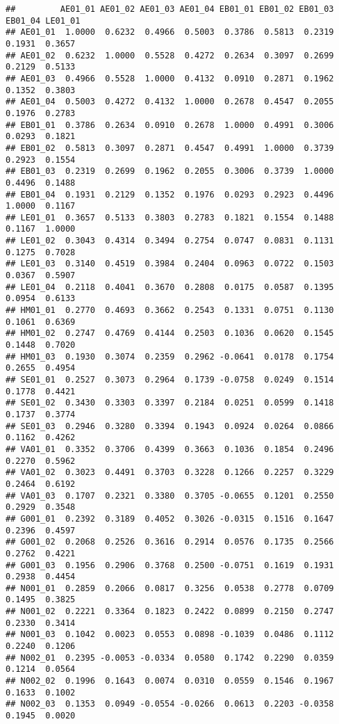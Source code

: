 \documentclass[
]{article}
\begin{document}
\begin{verbatim}
##         AE01_01 AE01_02 AE01_03 AE01_04 EB01_01 EB01_02 EB01_03 EB01_04 LE01_01
## AE01_01  1.0000  0.6232  0.4966  0.5003  0.3786  0.5813  0.2319  0.1931  0.3657
## AE01_02  0.6232  1.0000  0.5528  0.4272  0.2634  0.3097  0.2699  0.2129  0.5133
## AE01_03  0.4966  0.5528  1.0000  0.4132  0.0910  0.2871  0.1962  0.1352  0.3803
## AE01_04  0.5003  0.4272  0.4132  1.0000  0.2678  0.4547  0.2055  0.1976  0.2783
## EB01_01  0.3786  0.2634  0.0910  0.2678  1.0000  0.4991  0.3006  0.0293  0.1821
## EB01_02  0.5813  0.3097  0.2871  0.4547  0.4991  1.0000  0.3739  0.2923  0.1554
## EB01_03  0.2319  0.2699  0.1962  0.2055  0.3006  0.3739  1.0000  0.4496  0.1488
## EB01_04  0.1931  0.2129  0.1352  0.1976  0.0293  0.2923  0.4496  1.0000  0.1167
## LE01_01  0.3657  0.5133  0.3803  0.2783  0.1821  0.1554  0.1488  0.1167  1.0000
## LE01_02  0.3043  0.4314  0.3494  0.2754  0.0747  0.0831  0.1131  0.1275  0.7028
## LE01_03  0.3140  0.4519  0.3984  0.2404  0.0963  0.0722  0.1503  0.0367  0.5907
## LE01_04  0.2118  0.4041  0.3670  0.2808  0.0175  0.0587  0.1395  0.0954  0.6133
## HM01_01  0.2770  0.4693  0.3662  0.2543  0.1331  0.0751  0.1130  0.1061  0.6369
## HM01_02  0.2747  0.4769  0.4144  0.2503  0.1036  0.0620  0.1545  0.1448  0.7020
## HM01_03  0.1930  0.3074  0.2359  0.2962 -0.0641  0.0178  0.1754  0.2655  0.4954
## SE01_01  0.2527  0.3073  0.2964  0.1739 -0.0758  0.0249  0.1514  0.1778  0.4421
## SE01_02  0.3430  0.3303  0.3397  0.2184  0.0251  0.0599  0.1418  0.1737  0.3774
## SE01_03  0.2946  0.3280  0.3394  0.1943  0.0924  0.0264  0.0866  0.1162  0.4262
## VA01_01  0.3352  0.3706  0.4399  0.3663  0.1036  0.1854  0.2496  0.2270  0.5962
## VA01_02  0.3023  0.4491  0.3703  0.3228  0.1266  0.2257  0.3229  0.2464  0.6192
## VA01_03  0.1707  0.2321  0.3380  0.3705 -0.0655  0.1201  0.2550  0.2929  0.3548
## G001_01  0.2392  0.3189  0.4052  0.3026 -0.0315  0.1516  0.1647  0.2396  0.4597
## G001_02  0.2068  0.2526  0.3616  0.2914  0.0576  0.1735  0.2566  0.2762  0.4221
## G001_03  0.1956  0.2906  0.3768  0.2500 -0.0751  0.1619  0.1931  0.2938  0.4454
## N001_01  0.2859  0.2066  0.0817  0.3256  0.0538  0.2778  0.0709  0.1495  0.3825
## N001_02  0.2221  0.3364  0.1823  0.2422  0.0899  0.2150  0.2747  0.2330  0.3414
## N001_03  0.1042  0.0023  0.0553  0.0898 -0.1039  0.0486  0.1112  0.2240  0.1206
## N002_01  0.2395 -0.0053 -0.0334  0.0580  0.1742  0.2290  0.0359  0.1214  0.0564
## N002_02  0.1996  0.1643  0.0074  0.0310  0.0559  0.1546  0.1967  0.1633  0.1002
## N002_03  0.1353  0.0949 -0.0554 -0.0266  0.0613  0.2203 -0.0358  0.1945  0.0020

\end{verbatim}
\end{document}
